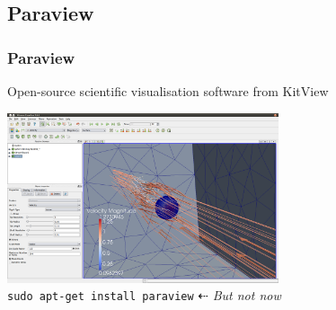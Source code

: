 \documentclass[12pt]{beamer}
\begin{document}
\subsection{Paraview}
\begin{frame}
    \frametitle{Paraview}
Open-source scientific visualisation software from KitView
\begin{center}
\includegraphics[width=0.6\textwidth]{images/paraview_example.png}\\
\vspace{5mm}
{\tt sudo apt-get install paraview} $\dashleftarrow$ \emph{\color{red}But not now}
\end{center}
\end{frame}
\end{document}

